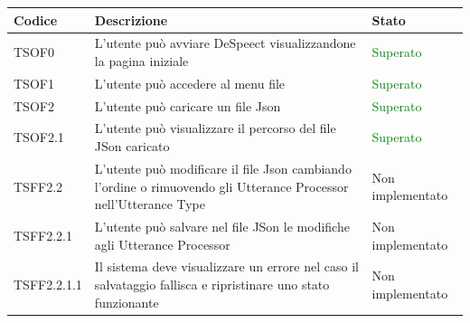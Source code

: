 \documentclass[openany,12pt,a4paper]{report}
\begin{document}
\setlength\LTleft{6mm}
	\begin{longtable}[c]{| p{2cm} |p{8cm} | p{2.5cm} |}
	\hline
	\textbf{Codice} & \textbf{Descrizione} & \textbf{Stato}\\
	\hline
	\endhead
	\newline TSOF0&
	\newline L'utente può avviare DeSpeect visualizzandone la pagina iniziale&
	\newline \textcolor{green}{Superato}
	\\[1em]
	\hline
	\newline TSOF1&
	\newline L'utente può accedere al menu file&
	\newline \textcolor{green}{Superato}
	\\[1em]	
	
	\hline
	
	\newline TSOF2&
	\newline L'utente può caricare un file Json&
	\newline \textcolor{green}{Superato}
	\\[1em]	
	\hline	
	
	\newline TSOF2.1&
	\newline L'utente può visualizzare il percorso del file JSon caricato&
	\newline \textcolor{green}{Superato}
	\\[1em]	
	\hline	
	
	\newline TSFF2.2&
	\newline L'utente può modificare il file Json cambiando l'ordine o rimuovendo gli Utterance Processor nell'Utterance Type&
	\newline Non implementato
	\\[1em]	
	\hline
	
	\newline TSFF2.2.1&
	\newline L'utente può salvare nel file JSon le modifiche agli Utterance Processor&
	\newline Non implementato
	\\[1em]	
	\hline
	
	\newline TSFF2.2.1.1&
	\newline Il sistema deve visualizzare un errore nel caso il salvataggio fallisca e ripristinare uno stato funzionante&
	\newline Non implementato
	\\[1em]	
	\hline
	

\end{longtable}
\end{document}
